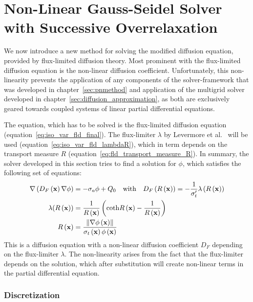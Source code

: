 
\section{Non-Linear Gauss-Seidel Solver with Successive Overrelaxation}
\label{sec:fld_solver}

We now introduce a new method for solving the modified diffusion equation, provided by flux-limited diffusion theory. Most prominent with the flux-limited diffusion equation is the non-linear diffusion coefficient. Unfortunately, this non-linearity prevents the application of any components of the solver-framework that was developed in chapter~\ref{sec:pnmethod} and application of the multigrid solver developed in chapter~\ref{sec:diffusion_approximation}, as both are exclusively geared towards coupled systems of linear partial differential equations.

The equation, which has to be solved is the flux-limited diffusion equation (equation~\ref{eq:iso_var_fld_final}). The flux-limiter $\lambda$ by Levermore et al.~\cite{Levermore81} will be used (equation~\ref{eq:iso_var_fld_lambdaR}), which in term depends on the transport measure $R$ (equation~\ref{eq:fld_transport_measure_R}). In summary, the solver developed in this section tries to find a solution for $\phi$, which satisfies the following set of equations:
\begin{align}
\nabla\left(D_F\left(\boldsymbol{\mathbf{x}}\right)\nabla\phi\right) &= -\sigma_a\phi + Q_0
\quad \text{with}\quad
D_F\left(R\left(\boldsymbol{\mathbf{x}}\right)\right) = -\frac{1}{\sigma_t'}\lambda\left(R\left(\boldsymbol{\mathbf{x}}\right)\right)
\label{eq:fld_solver_diffusion_equation}
\\
\lambda(R\left(\boldsymbol{\mathbf{x}}\right)) &= \frac{1}{R\left(\boldsymbol{\mathbf{x}}\right)}\left(\mathbf{\operatorname{coth}}R\left(\boldsymbol{\mathbf{x}}\right) - \frac{1}{R\left(\boldsymbol{\mathbf{x}}\right)}\right)
\label{eq:fld_solver_flux_limiter}
\\
R\left(\boldsymbol{\mathbf{x}}\right) &= \frac{\left\lVert\nabla\phi\left(\boldsymbol{\mathbf{x}}\right)\right\rVert}{\sigma_t\left(\boldsymbol{\mathbf{x}}\right)\phi\left(\boldsymbol{\mathbf{x}}\right)}
\label{eq:fld_solver_transport_measure_R}
\end{align}
This is a diffusion equation with a non-linear diffusion coefficient $D_F$ depending on the flux-limiter $\lambda$. The non-linearity arises from the fact that the flux-limiter depends on the solution, which after substitution will create non-linear terms in the partial differential equation.

\subsubsection*{Discretization}

